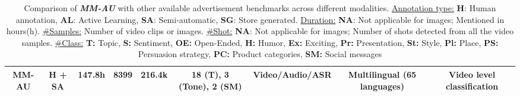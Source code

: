 \begin{table}[h!]
{\begin{tabular}{|c|c|c|c|c|c|c|c|c|}
\textbf{MM-AU}         & \textbf{H + SA}          & \textbf{147.8h}   & \textbf{8399}      & \textbf{216.4k} & \textbf{18 (T), 3 (Tone), 2 (SM)}    & \textbf{Video/Audio/ASR} & \textbf{Multilingual (65 languages)} & \textbf{Video level classification} \\ \hline
\end{tabular}
}
\vspace{5mm}
\caption{Comparison of \textbf{\textit{MM-AU}} with other available advertisement benchmarks across different modalities.  \underline{Annotation type:} \textbf{H}: Human annotation, \textbf{AL}: Active Learning, \textbf{SA}: Semi-automatic, \textbf{SG}: Store generated. \underline{Duration:} \textbf{NA}: Not applicable for images; Mentioned in hours(h). \underline{\#Samples:} Number of video clips or images. \underline{\#Shot:} \textbf{NA}: Not applicable for images; Number of shots detected from all the video samples. \underline{\#Class:} \textbf{T:} Topic, \textbf{S:} Sentiment, \textbf{OE:} Open-Ended, \textbf{H:} Humor, \textbf{Ex:} Exciting, \textbf{Pr:} Presentation, \textbf{St:} Style, \textbf{Pl:} Place, \textbf{PS:} Persuasion strategy, \textbf{PC:} Product categories, \textbf{SM:} Social messages}
\label{Overview}
\end{table}

